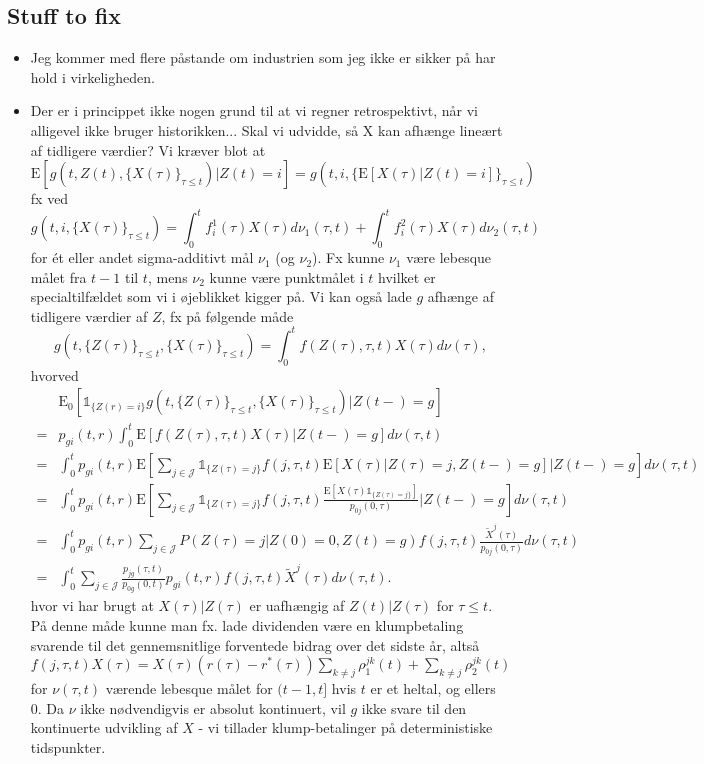 \documentclass[12pt]{article}
\newcommand{\E}{\text{E}}
\newcommand{\indic}[1]{\mathds{1}_{ \{ #1 \} }}
\theoremstyle{my_thm}
\begin{document}
\subsection*{Stuff to fix}
\begin{itemize}
\item Jeg kommer med flere påstande om industrien som jeg ikke er sikker på har hold i virkeligheden.
\item Der er i princippet ikke nogen grund til at vi regner retrospektivt, når vi alligevel ikke bruger historikken... Skal vi udvidde, så X kan afhænge lineært af tidligere værdier? Vi kræver blot at
$$
\E[g(t,Z(t),\{ X(\tau) \}_{\tau\leq t})|Z(t)=i]=g(t,i,\{ \E[X(\tau)|Z(t)=i] \}_{\tau \leq t})$$
fx ved
$$
g(t,i,\{X(\tau)\}_{\tau \leq t})=\int_0^t f^1_i(\tau) X(\tau) d\nu_1(\tau,t) + \int_0^t f^2_i(\tau) X(\tau) d\nu_2(\tau,t)
$$
for ét eller andet sigma-additivt mål $\nu_1$ (og $\nu_2$). Fx kunne $\nu_1$ være lebesque målet fra $t-1$ til $t$, mens $\nu_2$ kunne være punktmålet i $t$ hvilket er specialtilfældet som vi i øjeblikket kigger på. Vi kan også lade $g$ afhænge af tidligere værdier af $Z$, fx på følgende måde
$$
g(t,\{Z(\tau)\}_{\tau\leq t},\{X(\tau)\}_{\tau\leq t})=
\int_0^t f(Z(\tau),\tau,t) X(\tau) d\nu(\tau),
$$
hvorved
\begin{align*}
&\E_0[\indic{Z(r)=i}g(t,\{Z(\tau)\}_{\tau\leq t},\{X(\tau)\}_{\tau\leq t})|Z(t-)=g]
\\
=&
p_{gi}(t,r)\int_0^t \E[ f(Z(\tau),\tau,t) X(\tau)|Z(t-)=g] d\nu(\tau,t)
\\
=&
\int_0^t p_{gi}(t,r) \E \left[ \sum_{j \in \mathcal{J}}  \indic{Z(\tau)=j} f(j,\tau,t) \E[X(\tau)|Z(\tau)=j,Z(t-)=g] \bigg| Z(t-)=g \right] d\nu(\tau,t)
\\
=&
\int_0^t p_{gi}(t,r) \E \left[ \sum_{j \in \mathcal{J}}  \indic{Z(\tau)=j} f(j,\tau,t) \frac{\E[X(\tau)\indic{Z(\tau)=j}]}{p_{0j}(0,\tau)} \bigg| Z(t-)=g \right] d\nu(\tau,t)
\\
=&
\int_0^t p_{gi}(t,r) \sum_{j \in \mathcal{J}}  P(Z(\tau)=j|Z(0)=0,Z(t)=g) f(j,\tau,t) \frac{\tilde{X}^j(\tau)}{p_{0j}(0,\tau)}  d\nu(\tau,t)
\\
=&
\int_0^t \sum_{j \in \mathcal{J}} \frac{p_{jg}(\tau,t)}{p_{0g}(0,t)} p_{gi}(t,r) f(j,\tau,t) \tilde{X}^j(\tau) d\nu(\tau,t).
\end{align*}
hvor vi har brugt at $X(\tau)|Z(\tau)$ er uafhængig af $Z(t)|Z(\tau)$ for $\tau\leq t$. På denne måde kunne man fx. lade dividenden være en klumpbetaling svarende til det gennemsnitlige forventede bidrag over det sidste år, altså $f(j,\tau,t)X(\tau)=X(\tau)(r(\tau)-r^*(\tau))\sum_{k\neq j} \rho_1^{jk}(t)+\sum_{k\neq j} \rho_2^{jk}(t)$ for $\nu(\tau,t)$ værende lebesque målet for $(t-1,t]$ hvis $t$ er et heltal, og ellers 0. Da $\nu$ ikke nødvendigvis er absolut kontinuert, vil $g$ ikke svare til den kontinuerte udvikling af $X$ - vi tillader klump-betalinger på deterministiske tidspunkter.

\end{itemize}
\end{document}
